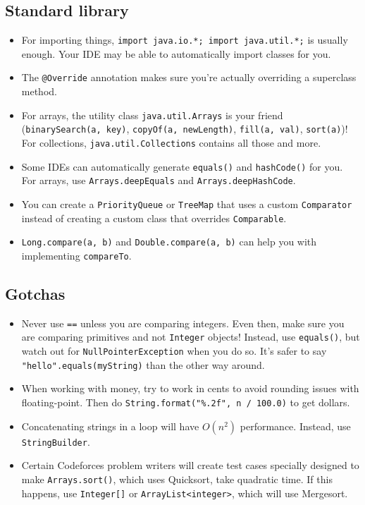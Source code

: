 \documentclass{article}
\begin{document}
\subsection{Standard library}

\begin{itemize}
    \item For importing things, \verb|import java.io.*; import java.util.*;| is usually enough. Your IDE may be able to automatically import classes for you.
    \item The \verb|@Override| annotation makes sure you're actually overriding a superclass method.
    \item For arrays, the utility class \verb|java.util.Arrays| is your friend (\verb|binarySearch(a, key)|, \verb|copyOf(a, newLength)|, \verb|fill(a, val)|, \verb|sort(a)|)! For collections, \verb|java.util.Collections| contains all those and more.
    \item Some IDEs can automatically generate \verb|equals()| and \verb|hashCode()| for you. For arrays, use    \verb|Arrays.deepEquals| and \verb|Arrays.deepHashCode|.
    \item You can create a \verb|PriorityQueue| or \verb|TreeMap| that uses a custom \verb|Comparator| instead of creating a custom class that overrides \verb|Comparable|.
    \item \verb|Long.compare(a, b)| and \verb|Double.compare(a, b)| can help you with implementing \verb|compareTo|.
\end{itemize}

\subsection{Gotchas}

\begin{itemize}
    \item Never use \verb|==| unless you are comparing integers. Even then, make sure you are comparing primitives and not \verb|Integer| objects! Instead, use \verb|equals()|, but watch out for \verb|NullPointerException| when you do so. It's safer to say \verb|"hello".equals(myString)| than the other way around.
    \item When working with money, try to work in cents to avoid rounding issues with floating-point. Then do \verb|String.format("%.2f", n / 100.0)| to get dollars.
    \item Concatenating strings in a loop will have $O(n^2)$ performance. Instead, use \verb|StringBuilder|.
    \item Certain Codeforces problem writers will create test cases specially designed to make \verb|Arrays.sort()|, which uses Quicksort, take quadratic time. If this happens, use \verb|Integer[]| or \verb|ArrayList<integer>|, which will use Mergesort.
\end{itemize}
\end{document}

